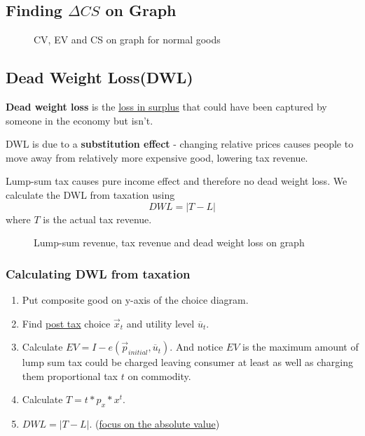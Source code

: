 \documentclass[]{article}
\begin{document}
        \subsection{Finding $\Delta CS$ on Graph}
            \begin{figure}[h]
                \centering
                \caption{CV, EV and CS on graph for normal goods}
            \end{figure}
            
        \subsection{Dead Weight Loss(DWL)}
            \begin{definition}
                \textbf{Dead weight loss} is the \ul{loss in surplus} that could have been captured by someone in the economy but isn't.
            \end{definition}
            
            \begin{remark}
                DWL is due to a \textbf{substitution effect} - changing relative prices causes people to move away from relatively more expensive good, lowering tax revenue.
            \end{remark}
            
            \begin{remark}
                Lump-sum tax causes pure income effect and therefore no dead weight loss. We calculate the DWL from taxation using 
                \[
                    DWL = |T - L|
                \]
                where $T$ is the actual tax revenue.
            \end{remark}
            
            \begin{figure}[h]
                \centering
                \caption{Lump-sum revenue, tax revenue and dead weight loss on graph}
            \end{figure}
            
            \subsubsection{Calculating DWL from taxation}
                \begin{enumerate}
                    \item Put composite good on y-axis of the choice diagram.
                    \item Find \ul{post tax} choice $\vec{x}_t$ and utility level $\overline{u}_t$.
                    \item Calculate $EV = I - e(\vec{p}_{initial}, \overline{u}_t)$. And notice $EV$ is the maximum amount of lump sum tax could be charged leaving consumer at least as well as charging them proportional tax $t$ on commodity.
                    \item Calculate $T = t*p_x*x^t$.
                    \item $DWL = |T - L|$. (\ul{focus on the absolute value})
                \end{enumerate}
            
\end{document}
